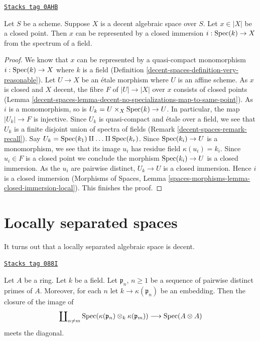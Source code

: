 \begin{lemma}
\label{decent-spaces-lemma-decent-space-closed-point}
\href{https://stacks.math.columbia.edu/tag/0AHB}{\texttt{Stacks tag 0AHB}}

Let $S$ be a scheme. Suppose $X$ is a decent algebraic space over $S$.
Let $x \in |X|$ be a closed point. Then $x$ can be represented by a
closed immersion $i : \operatorname{Spec}(k) \to X$ from the spectrum of a field.
\end{lemma}

\begin{proof}
We know that $x$ can be represented by a quasi-compact monomorphism
$i : \operatorname{Spec}(k) \to X$ where $k$ is a field
(Definition \ref{decent-spaces-definition-very-reasonable}).
Let $U \to X$ be an \'etale morphism where $U$ is an affine scheme.
As $x$ is closed and $X$ decent, the fibre $F$ of $|U| \to |X|$ over $x$
consists of closed points
(Lemma \ref{decent-spaces-lemma-decent-no-specializations-map-to-same-point}).
As $i$ is a monomorphism, so is $U_k = U \times_X \operatorname{Spec}(k) \to U$.
In particular, the map $|U_k| \to F$ is injective. Since $U_k$
is quasi-compact and \'etale over a field, we see that $U_k$ is a
finite disjoint union of spectra of fields (Remark \ref{decent-spaces-remark-recall}).
Say $U_k = \operatorname{Spec}(k_1) \amalg \ldots \amalg \operatorname{Spec}(k_r)$.
Since $\operatorname{Spec}(k_i) \to U$ is a monomorphism, we see that
its image $u_i$ has residue field $\kappa(u_i) = k_i$.
Since $u_i \in F$ is a closed point we conclude the morphism
$\operatorname{Spec}(k_i) \to U$ is a closed immersion. As the $u_i$ are pairwise distinct,
$U_k \to U$ is a closed immersion. Hence $i$ is a closed immersion
(Morphisms of Spaces, Lemma
\ref{spaces-morphisms-lemma-closed-immersion-local}). This finishes the proof.
\end{proof}

\section{Locally separated spaces}
\label{decent-spaces-section-locally-separated}
It turns out that a locally separated algebraic space is decent.

\begin{lemma}
\label{decent-spaces-lemma-infinite-number}
\href{https://stacks.math.columbia.edu/tag/088I}{\texttt{Stacks tag 088I}}

Let $A$ be a ring. Let $k$ be a field. Let $\mathfrak p_n$, $n \geq 1$
be a sequence of pairwise distinct primes of $A$. Moreover, for each
$n$ let $k \to \kappa(\mathfrak p_n)$ be an embedding. Then the closure
of the image of
$$
\coprod\nolimits_{n \not = m}
\operatorname{Spec}(\kappa(\mathfrak p_n) \otimes_k \kappa(\mathfrak p_m))
\longrightarrow
\operatorname{Spec}(A \otimes A)
$$
meets the diagonal.
\end{lemma}

